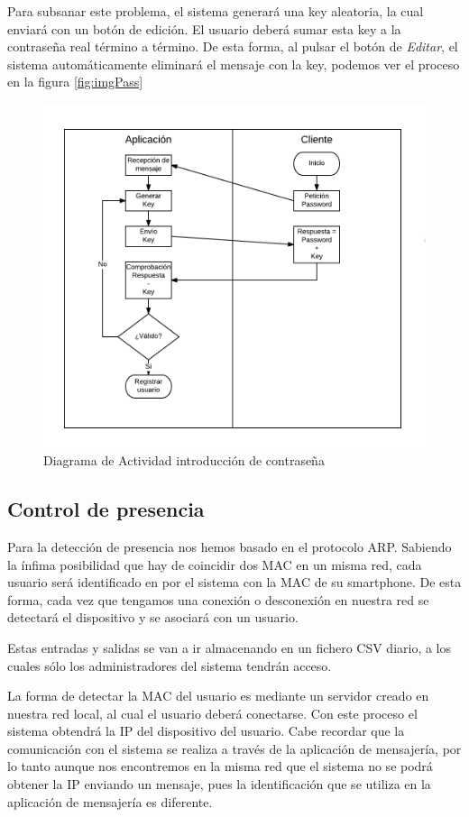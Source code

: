 \documentclass[10pt,journal,compsoc]{IEEEtran}
\begin{document}
Para subsanar este problema, el sistema generará una key aleatoria, la cual enviará con un 
botón de edición. El usuario deberá sumar esta key a la contraseña real término a término.
De esta forma, al pulsar el botón de \textit{Editar}, el sistema automáticamente eliminará el 
mensaje con la key, podemos ver el proceso en la figura \ref{fig:imgPass}

\begin{figure}[h]
\centering
\includegraphics[scale=0.5]{ActPass}
\caption{Diagrama de Actividad introducción de contraseña}
\label{fig:ActPass}
\end{figure}

\subsection{Control de presencia}
Para la detección de presencia nos hemos basado en el protocolo ARP. Sabiendo la 
ínfima posibilidad que hay de coincidir dos MAC en un misma red, cada usuario 
será identificado en por el sistema con la MAC de su smartphone. De esta forma, 
cada vez que tengamos una conexión o desconexión en nuestra red se detectará el 
dispositivo y se asociará con un usuario.

Estas entradas y salidas se van a ir almacenando en un fichero CSV diario, a los 
cuales sólo los administradores del sistema tendrán acceso. 

La forma de detectar la MAC del usuario es mediante un servidor creado en 
nuestra red local, al cual el usuario deberá conectarse. Con este proceso el 
sistema obtendrá la IP del dispositivo del usuario. 
Cabe recordar que la comunicación con el sistema se realiza a través de la 
aplicación de mensajería, por lo tanto aunque nos encontremos en la misma red 
que el sistema no se podrá obtener la IP enviando un mensaje, pues la 
identificación que se utiliza en la aplicación de mensajería es diferente.
\end{document}

